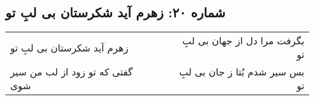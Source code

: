 \begin{center}
\section*{شماره ۲۰: زهرم آید شکرستان بی لبِ تو}
\label{sec:020}
\begin{longtable}{l p{0.5cm} r}
زهرم آید شکرستان بی لبِ تو
&&
بگرفت مرا دل از جهان بی لبِ تو
\\
گفتی که تو زود از لب من سیر شوی
&&
بس سیر شدم بُتا ز جان بی لبِ تو
\\
\end{longtable}
\end{center}
